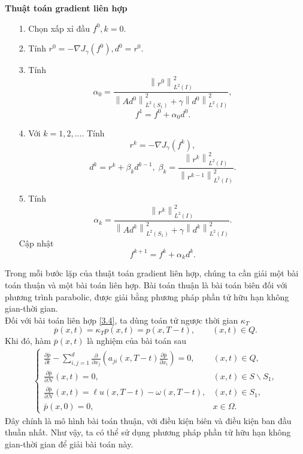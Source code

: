 \documentclass[]{article}
\begin{document}
\noindent \textbf{Thuật toán gradient liên hợp}
\begin{itemize}
	\item[1.] Chọn xấp xỉ đầu $f^0, k=0$.
	\item[2.] Tính $r^0=-\nabla J_\gamma(f^0), d^0=r^0$.
	\item[3.] Tính
	$$\alpha_0=\frac{\left\|r^0\right\|^2_{L^2(I)}}{\left\|Ad^0\right\|^2_{L^2(S_1)}+\gamma\left\|d^0\right\|^2_{L^2(I)}},$$
	$$f^1=f^0+\alpha_0d^0.$$
	\item[4.] Với $k=1, 2,...$. Tính
	$$r^k=-\nabla J_\gamma(f^k),$$
	$$d^k=r^k+\beta_kd^{k-1}, \; \beta_k=\frac{\left\|r^k\right\|^2_{L^2(I)}}{\left\|r^{k-1}\right\|^2_{L^2(I)}}.$$
	\item[5.] Tính
	$$\alpha_k=\frac{\left\|r^k\right\|^2_{L^2(I)}}{\left\|Ad^k\right\|^2_{L^2(S_1)}+\gamma\left\|d^k\right\|^2_{L^2(I)}}.$$
	Cập nhật
	$$f^{k+1}=f^{k}+\alpha_kd^k.$$
\end{itemize}
Trong mỗi bước lặp của thuật toán gradient liên hợp, chúng ta cần giải một bài toán thuận và một bài toán liên hợp. Bài toán thuận là bài toán biên đối với phương trình parabolic, được giải bằng phương pháp phần tử hữu hạn không gian-thời gian.\\
Đối với bài toán liên hợp \eqref{3.4}, ta dùng toán tử ngược thời gian $\kappa_T$
$$\overline{p}(x, t)=\kappa_Tp(x, t)=p(x, T-t), \qquad (x, t)\in Q.$$
Khi đó, hàm $\overline{p}(x, t)$ là nghiệm của bài toán sau
\begin{align*}
	\begin{cases}
		\frac{\partial \bar{p}}{\partial t}-\sum\limits_{i, j=1}^{d}\frac{\partial}{\partial x_j}\left(a_{ji}(x, T-t)\frac{\partial \bar{p}}{\partial x_i}\right)=0, & (x, t)\in Q,\\
		\frac{\partial \bar{p}}{\partial \mathcal{N}}(x, t)=0, & (x, t)\in S\backslash S_1,\\[0.2cm]
		\frac{\partial \bar{p}}{\partial \mathcal{N}}(x, t)=\ell u(x,T-t)-\omega(x, T-t), & (x, t)\in S_1,\\
		\bar{p}(x, 0)=0, & x\in \Omega.
	\end{cases}
\end{align*}
Đây chính là mô hình bài toán thuận, với điều kiện biên và điều kiện ban đầu thuần nhất. Như vậy, ta có thể sử dụng phương pháp phần tử hữu hạn không gian-thời gian để giải bài toán này.
\end{document}
